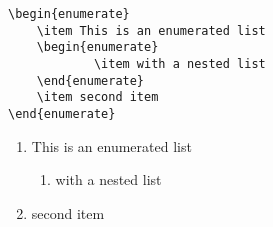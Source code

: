 \documentclass[12pt,a4paper]{article}
\begin{document}
\begin{verbatim}
\begin{enumerate}
	\item This is an enumerated list
	\begin{enumerate}
			\item with a nested list
	\end{enumerate}
	\item second item
\end{enumerate}
\end{verbatim}
\begin{enumerate}
	\item This is an enumerated list
	\begin{enumerate}
			\item with a nested list
	\end{enumerate}
	\item second item
\end{enumerate}
\end{document}
